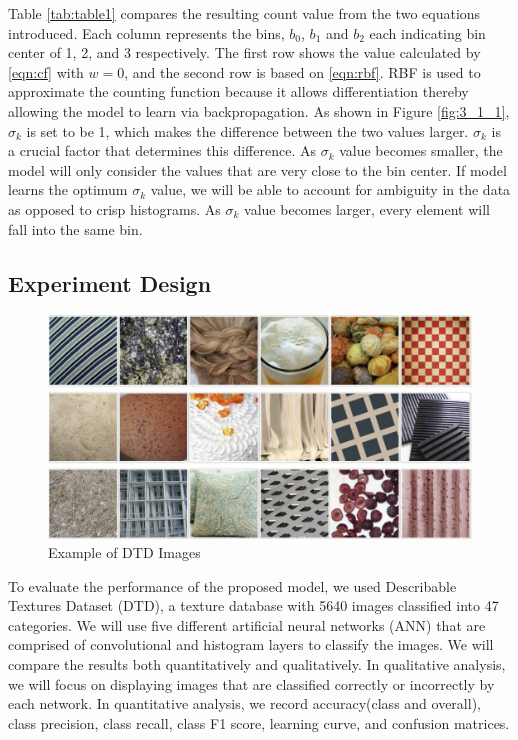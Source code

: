 \documentclass[10pt,twocolumn,letterpaper]{article}
\begin{document}
Table \ref{tab:table1} compares the resulting count value from the two equations introduced. Each column represents the bins, $b_0$, $b_1$ and $b_2$ each indicating bin center of 1, 2, and 3 respectively. The first row shows the value calculated by \eqref{eqn:cf} with $w = 0$, and the second row is based on \eqref{eqn:rbf}. RBF is used to approximate the counting function because it allows differentiation thereby allowing the model to learn via backpropagation. As shown in Figure \ref{fig:3_1_1}, $\sigma_k$ is set to be 1, which makes the difference between the two values larger. $\sigma_k$ is a crucial factor that determines this difference. As $\sigma_k$ value becomes smaller, the model will only consider the values that are very close to the bin center. If model learns the optimum $\sigma_k$ value, we will be able to account for ambiguity in the data as opposed to crisp histograms. As $\sigma_k$ value becomes larger, every element will fall into the same bin.

\subsection{Experiment Design}

\begin{figure}
	\includegraphics[width=1.0\linewidth]{./Images/3_2_1.png}
	\caption{Example of DTD Images \cite{cimpoi14DTD}}
	\label{fig:3_2_1}
\end{figure}

To evaluate the performance of the proposed model, we used Describable Textures Dataset (DTD), a texture database with 5640 images classified into 47 categories. We will use five different artificial neural networks (ANN) that are comprised of convolutional and histogram layers to classify the images. We will compare the results both quantitatively and qualitatively. In qualitative analysis, we will focus on displaying images that are classified correctly or incorrectly by each network. In quantitative analysis, we record accuracy(class and overall), class precision, class recall, class F1 score, learning curve, and confusion matrices.
\end{document}
